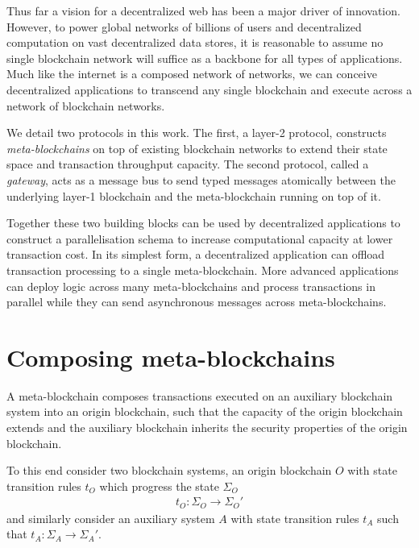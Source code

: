 \documentclass[12pt,a4paper]{article}
\begin{document}
Thus far a vision for a decentralized web has been a major driver of innovation.
However, to power global networks of billions of users and decentralized computation on vast decentralized data stores, it is reasonable to assume no single blockchain network will suffice as a backbone for all types of applications.
Much like the internet is a composed network of networks, we can conceive decentralized applications to transcend any single blockchain and execute across a network of blockchain networks.

We detail two protocols in this work.
The first, a layer-2 protocol, constructs \emph{meta-blockchains} on top of existing blockchain networks to extend their state space and transaction throughput capacity.
The second protocol, called a \emph{gateway}, acts as a message bus to send typed messages atomically between the underlying layer-1 blockchain and the meta-blockchain running on top of it.

Together these two building blocks can be used by decentralized applications to construct a parallelisation schema to increase %
computational capacity at lower transaction cost.
In its simplest form, a decentralized application can offload transaction processing to a single meta-blockchain.
More advanced applications can deploy logic across many meta-blockchains and process transactions in parallel while they can send asynchronous messages across meta-blockchains.


%
%
\section{Composing meta-blockchains}

A meta-blockchain composes transactions executed on an auxiliary blockchain system into an origin blockchain, such that the capacity of the origin blockchain extends and the auxiliary blockchain inherits the security properties of the origin blockchain.

To this end consider two blockchain systems, an origin blockchain $O$ with state transition rules $t_O$ which progress the state $\Sigma_O$ 
\begin{align} \label{state_transition_rules}
  t_O : \Sigma_O \rightarrow \Sigma_O'
\end{align}
and similarly consider an auxiliary system $A$ with state transition rules $t_A$ such that $t_A : \Sigma_A \rightarrow \Sigma_A'$.
\end{document}
